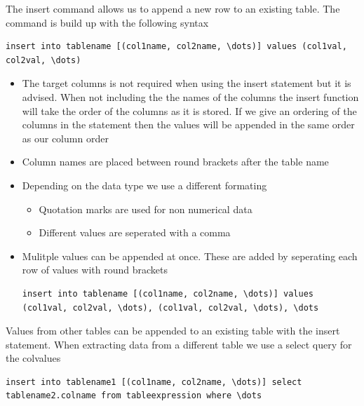 \documentclass{article}
\begin{document}
The insert command allows us to append a new row to an existing table.
The command is build up with the following syntax 
\begin{lstlisting}[frame=single]
    insert into tablename [(col1name, col2name, \dots)] values (col1val, col2val, \dots)
\end{lstlisting}
\begin{itemize}
    \item The target columns is not required when using the insert statement but it is advised. When not including the the names of the columns the insert function will take the order of the columns as it is stored. If we give an ordering of the columns in the statement then the values will be appended in the same order as our column order
    \item Column names are placed between round brackets after the table name
    \item Depending on the data type we use a different formating
    \begin{itemize}
        \item Quotation marks are used for non numerical data 
        \item Different values are seperated with a comma
    \end{itemize}
    \item Mulitple values can be appended at once. These are added by seperating each row of values with round brackets 
    \begin{lstlisting}[frame=single]
        insert into tablename [(col1name, col2name, \dots)] values (col1val, col2val, \dots), (col1val, col2val, \dots), \dots        
    \end{lstlisting}
\end{itemize}
Values from other tables can be appended to an existing table with the insert statement. When extracting data from a different table we use a select query for the colvalues
\begin{lstlisting}[frame=single]
    insert into tablename1 [(col1name, col2name, \dots)] select tablename2.colname from tableexpression where \dots 
\end{lstlisting}
\end{document}
